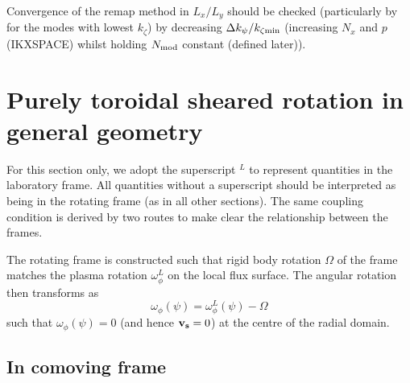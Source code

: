 Convergence of the remap method in $L_x / L_y$ should be checked (particularly by for the modes with lowest $k_\zeta$) by decreasing 
$\Delta k_\psi / k_{\zeta {\rm min}}$ (increasing $N_x$ and $p$ (IKXSPACE) whilst holding $N_{\rm mod}$ constant (defined later)).


\section{Purely toroidal sheared rotation in general geometry}

For this section only, we adopt the superscript $^L$ to represent quantities in the laboratory frame.  
All quantities without a superscript should be interpreted as being in the rotating frame (as in all other sections). 
The same coupling condition is derived by two routes to make clear the relationship between the frames.

The rotating frame is constructed \cite{PEE09} such that rigid body rotation $\Omega$ of the frame 
matches the plasma rotation $\omega_\phi^L$ on the local flux surface.  The angular rotation then transforms
as 
\begin{equation}
\omega_{\phi}(\psi)=\omega_{\phi}^L(\psi)-\Omega 
\label{eq:transform}
\end{equation}
such that $\omega_{\phi}(\psi)=0$ (and hence ${\bf
v_s}=0$) at the centre of the radial domain. 

\subsection{In comoving frame}

